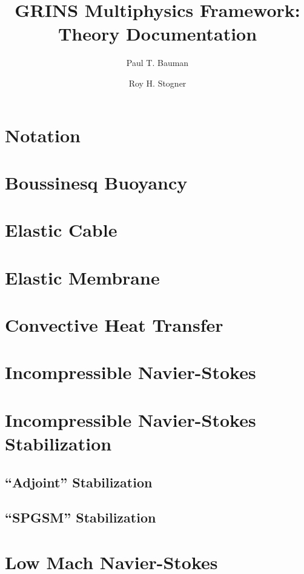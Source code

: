 \documentclass[twoside]{report}
\begin{document}
\author{Paul T. Bauman \and Roy H. Stogner}
\title{GRINS Multiphysics Framework:\\
Theory Documentation}
\maketitle
\tableofcontents

\chapter{Notation}


\chapter{Boussinesq Buoyancy}

\chapter{Elastic Cable}

\chapter{Elastic Membrane}

\chapter{Convective Heat Transfer}

\chapter{Incompressible Navier-Stokes}

\chapter{Incompressible Navier-Stokes Stabilization}
\section{``Adjoint'' Stabilization}
\section{``SPGSM'' Stabilization}

\chapter{Low Mach Navier-Stokes}

\end{document}
